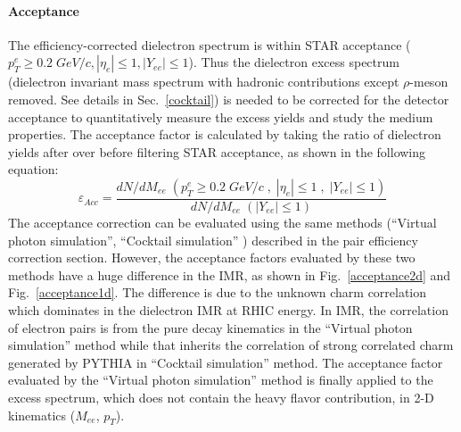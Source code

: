 \paragraph{Acceptance}
The efficiency-corrected dielectron spectrum is within STAR acceptance ($p_{T}^{e} \geq 0.2\;GeV/c, |\eta_{e}| \leq 1, |Y_{ee}| \leq 1$). Thus the dielectron excess spectrum (dielectron invariant mass spectrum with hadronic contributions except $\rho$-meson removed. See details in Sec.~\ref{cocktail}) is needed to be corrected for the detector acceptance to quantitatively measure the excess yields and study the medium properties. The acceptance factor is calculated by taking the ratio of dielectron yields after over before filtering STAR acceptance, as shown in the following equation:
\begin{equation}
\varepsilon_{Acc} = \frac{dN/dM_{ee}\;(p_{T}^{e}\geq0.2\;GeV/c\;,\;|\eta_{e}|\leq1\;,\;|Y_{ee}|\leq1)}{dN/dM_{ee}\;(|Y_{ee}|\leq1)}
\label{acceptance:eq}
\end{equation}
The acceptance correction can be evaluated using the same methods (``Virtual photon simulation'', ``Cocktail simulation'' ) described in the pair efficiency correction section. However, the acceptance factors evaluated by these two methods have a huge difference in the IMR, as shown in Fig.~\ref{acceptance2d} and Fig.~\ref{acceptance1d}. The difference is due to the unknown charm correlation which dominates in the dielectron IMR at RHIC energy. In IMR, the correlation of electron pairs is from the pure decay kinematics in the ``Virtual photon simulation'' method while that inherits the correlation of strong correlated charm generated by PYTHIA in ``Cocktail simulation'' method. The acceptance factor evaluated by the ``Virtual photon simulation'' method is finally applied to the excess spectrum, which does not contain the heavy flavor contribution, in 2-D kinematics ($M_{ee}$, $p_{T}$).

